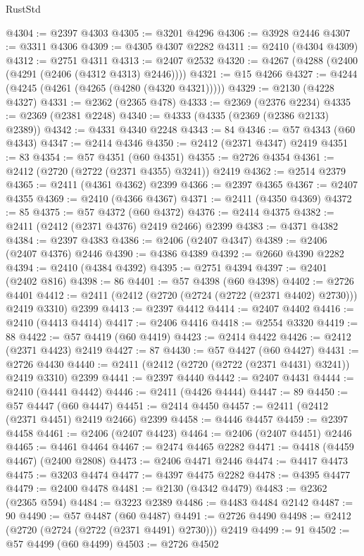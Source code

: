 \begin{lexlean}{RustStd}
\begin{coremodule}
@4304 := @2397 @4303
@4305 := @3201 @4296
@4306 := @3928 @2446
@4307 := @3311 @4306
@4309 := @4305 @4307 @2282
@4311 := @2410 (@4304 @4309)
@4312 := @2751 @4311
@4313 := @2407 @2532
@4320 := @4267 (@4288 (@2400 (@4291 (@2406 (@4312 @4313) @2446))))
@4321 := @15 @4266
@4327 := @4244 (@4245 (@4261 (@4265 (@4280 (@4320 @4321)))))
@4329 := @2130 (@4228 @4327)
@4331 := @2362 (@2365 @478)
@4333 := @2369 (@2376 @2234)
@4335 := @2369 (@2381 @2248)
@4340 := @4333 (@4335 (@2369 (@2386 @2133) @2389))
@4342 := @4331 @4340 @2248
@4343 := 84
@4346 := @57 @4343 (@60 @4343)
@4347 := @2414 @4346
@4350 := @2412 (@2371 @4347) @2419
@4351 := 83
@4354 := @57 @4351 (@60 @4351)
@4355 := @2726 @4354
@4361 := @2412 (@2720 (@2722 (@2371 @4355) @3241)) @2419
@4362 := @2514 @2379
@4365 := @2411 (@4361 @4362) @2399
@4366 := @2397 @4365
@4367 := @2407 @4355
@4369 := @2410 (@4366 @4367)
@4371 := @2411 (@4350 @4369)
@4372 := 85
@4375 := @57 @4372 (@60 @4372)
@4376 := @2414 @4375
@4382 := @2411 (@2412 (@2371 @4376) @2419 @2466) @2399
@4383 := @4371 @4382
@4384 := @2397 @4383
@4386 := @2406 (@2407 @4347)
@4389 := @2406 (@2407 @4376) @2446
@4390 := @4386 @4389
@4392 := @2660 @4390 @2282
@4394 := @2410 (@4384 @4392)
@4395 := @2751 @4394
@4397 := @2401 (@2402 @816)
@4398 := 86
@4401 := @57 @4398 (@60 @4398)
@4402 := @2726 @4401
@4412 := @2411 (@2412 (@2720 (@2724 (@2722 (@2371 @4402) @2730))) @2419 @3310) @2399
@4413 := @2397 @4412
@4414 := @2407 @4402
@4416 := @2410 (@4413 @4414)
@4417 := @2406 @4416
@4418 := @2554 @3320
@4419 := 88
@4422 := @57 @4419 (@60 @4419)
@4423 := @2414 @4422
@4426 := @2412 (@2371 @4423) @2419
@4427 := 87
@4430 := @57 @4427 (@60 @4427)
@4431 := @2726 @4430
@4440 := @2411 (@2412 (@2720 (@2722 (@2371 @4431) @3241)) @2419 @3310) @2399
@4441 := @2397 @4440
@4442 := @2407 @4431
@4444 := @2410 (@4441 @4442)
@4446 := @2411 (@4426 @4444)
@4447 := 89
@4450 := @57 @4447 (@60 @4447)
@4451 := @2414 @4450
@4457 := @2411 (@2412 (@2371 @4451) @2419 @2466) @2399
@4458 := @4446 @4457
@4459 := @2397 @4458
@4461 := @2406 (@2407 @4423)
@4464 := @2406 (@2407 @4451) @2446
@4465 := @4461 @4464
@4467 := @2474 @4465 @2282
@4471 := @4418 (@4459 @4467) (@2400 @2808)
@4473 := @2406 @4471 @2446
@4474 := @4417 @4473
@4475 := @3203 @4474
@4477 := @4397 @4475 @2282
@4478 := @4395 @4477
@4479 := @2400 @4478
@4481 := @2130 (@4342 @4479)
@4483 := @2362 (@2365 @594)
@4484 := @3223 @2389
@4486 := @4483 @4484 @2142
@4487 := 90
@4490 := @57 @4487 (@60 @4487)
@4491 := @2726 @4490
@4498 := @2412 (@2720 (@2724 (@2722 (@2371 @4491) @2730))) @2419
@4499 := 91
@4502 := @57 @4499 (@60 @4499)
@4503 := @2726 @4502

\end{coremodule}
\end{lexlean}

